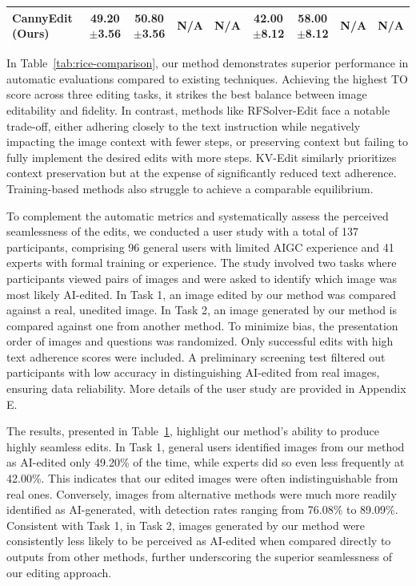 \documentclass{article}
\begin{document}
\begin{table}[t]
\begin{center}
{\begin{tabular}{lcccccccc}
\midrule
\textbf{CannyEdit (Ours)} & \textbf{49.20}{\scriptsize $\pm${3.56}} & \textbf{50.80}{\scriptsize $\pm${3.56}} & N/A & N/A & \textbf{42.00}{\scriptsize $\pm${8.12}} & \textbf{58.00}{\scriptsize $\pm${8.12}} & N/A & N/A\\
\bottomrule
\end{tabular}}
\label{tab:rice-human-study} 
\end{center}
\vspace{-2mm}
\end{table}



In Table~\ref{tab:rice-comparison}, our method demonstrates superior performance in automatic evaluations compared to existing techniques. Achieving the highest TO score across three editing tasks, it strikes the best balance between image editability and fidelity. In contrast, methods like RFSolver-Edit face a notable trade-off, either adhering closely to the text instruction while negatively impacting the image context with fewer steps, or preserving context but failing to fully implement the desired edits with more steps. KV-Edit similarly prioritizes context preservation but at the expense of significantly reduced text adherence. Training-based methods also struggle to achieve a comparable equilibrium.

To complement the automatic metrics and systematically assess the perceived seamlessness of the edits, we conducted a user study with a total of 137 participants, comprising 96 general users with limited AIGC experience and 41 experts with formal training or experience.
The study involved two tasks where participants viewed pairs of images and were asked to identify which image was most likely AI-edited. In Task 1, an image edited by our method was compared against a real, unedited image. In Task 2, an image generated by our method is compared against one from another method. To minimize bias, the presentation order of images and questions was randomized. Only successful edits with high text adherence scores were included. A preliminary screening test filtered out participants with low accuracy in distinguishing AI-edited from real images, ensuring data reliability. More details of the user study are provided in Appendix E.

The results, presented in Table~\ref{tab:rice-human-study}, highlight our method's ability to produce highly seamless edits. In Task 1, general users identified images from our method as AI-edited only 49.20\% of the time, while experts did so even less frequently at 42.00\%. This indicates that our edited images were often indistinguishable from real ones. Conversely, images from alternative methods were much more readily identified as AI-generated, with detection rates ranging from 76.08\% to 89.09\%. Consistent with Task 1, in Task 2, images generated by our method were consistently less likely to be perceived as AI-edited when compared directly to outputs from other methods, further underscoring the superior seamlessness of our editing approach.
\end{document}
